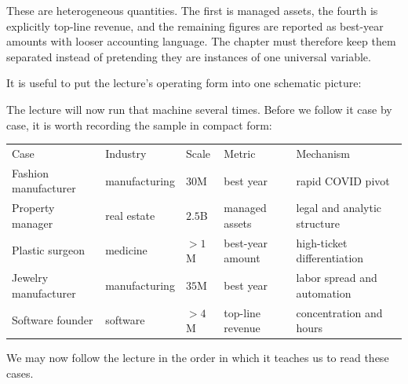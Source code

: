 \begin{remark}
These are heterogeneous quantities. The first is managed assets, the fourth is explicitly top-line revenue, and the remaining figures are reported as best-year amounts with looser accounting language. The chapter must therefore keep them separated instead of pretending they are instances of one universal variable.
\end{remark}

It is useful to put the lecture's operating form into one schematic picture:

\begin{figure}
\begin{center}
\end{center}
\end{figure}

The lecture will now run that machine several times. Before we follow it case by case, it is worth recording the sample in compact form:

\begin{table}
\begin{center}
\begin{tabular}{lllll}
Case & Industry & Scale & Metric & Mechanism \\
Fashion manufacturer & manufacturing & \(30\)M & best year & rapid COVID pivot \\
Property manager & real estate & \(2.5\)B & managed assets & legal and analytic structure \\
Plastic surgeon & medicine & \(>1\)M & best-year amount & high-ticket differentiation \\
Jewelry manufacturer & manufacturing & \(35\)M & best year & labor spread and automation \\
Software founder & software & \(>4\)M & top-line revenue & concentration and hours
\end{tabular}
\end{center}
\end{table}

We may now follow the lecture in the order in which it teaches us to read these cases.

